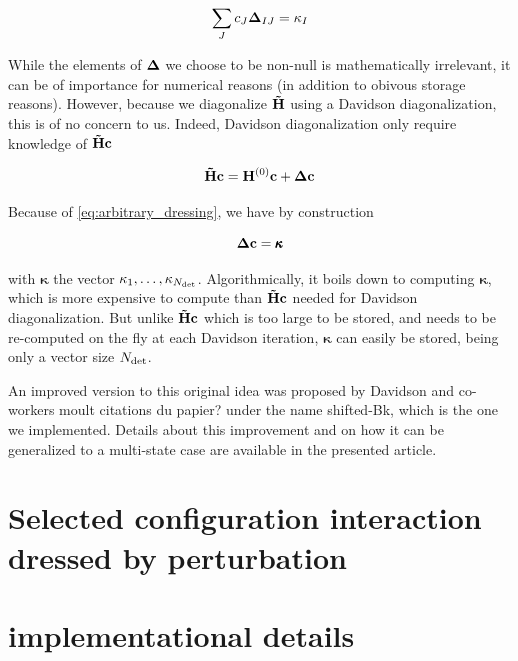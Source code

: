 \documentclass[./thesis.tex]{subfiles}
\begin{document}
\begin{equation}
\sum_J c_J {\bf \Delta}_{IJ}  = \kappa_I
\label{eq:arbitrary_dressing}
\end{equation}


While the elements of ${\bf \Delta}$ we choose to be non-null is mathematically irrelevant, it can be of importance for numerical reasons (in addition to obivous storage reasons). However, because we diagonalize ${\bf \tilde H}$ using a Davidson diagonalization, this is of no concern to us. Indeed, Davidson diagonalization only require knowledge of ${\bf \tilde H} {\bf c}$

\begin{equation}
{\bf \tilde H} {\bf c} = {\bf H}^{(0)} {\bf c} + {\bf \Delta} {\bf c}
\end{equation}

Because of \ref{eq:arbitrary_dressing}, we have by construction

\begin{equation}
{\bf \Delta} {\bf c} = {\pmb \kappa}
\end{equation}


with ${\pmb \kappa}$ the vector $\kappa_1, \ldots, \kappa_{{N_\text{det}}}$.
Algorithmically, it boils down to computing ${\pmb \kappa}$, which is more expensive to compute than ${\bf \tilde H}{\bf c}$ needed for Davidson diagonalization. But unlike ${\bf \tilde H}{\bf c}$ which is too large to be stored, and needs to be re-computed on the fly at each Davidson iteration, ${\pmb \kappa}$ can easily be stored, being only a vector size ${N_\text{det}}$.


An improved version to this original idea was proposed by Davidson and co-workers \alert{moult citations du papier?} under the name shifted-Bk, which is the one we implemented. Details about this improvement and on how it can be generalized to a multi-state case are available in the presented article.


\section{Selected configuration interaction dressed by perturbation}






\section{implementational details}
\end{document}
